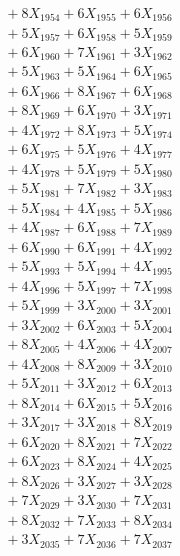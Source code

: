 \documentclass[a4paper,10pt]{article}
\begin{document}
{\begin{align}
&\;  + 8 X_{1954} + 6 X_{1955} + 6 X_{1956} \\[0.3ex]
&\;  + 5 X_{1957} + 6 X_{1958} + 5 X_{1959} \\[0.5ex]\allowbreak
&\;  + 6 X_{1960} + 7 X_{1961} + 3 X_{1962} \\[0.3ex]
&\;  + 5 X_{1963} + 5 X_{1964} + 6 X_{1965} \\[0.3ex]
&\;  + 6 X_{1966} + 8 X_{1967} + 6 X_{1968} \\[0.3ex]
&\;  + 8 X_{1969} + 6 X_{1970} + 3 X_{1971} \\[0.3ex]
&\;  + 4 X_{1972} + 8 X_{1973} + 5 X_{1974} \\[0.3ex]
&\;  + 6 X_{1975} + 5 X_{1976} + 4 X_{1977} \\[0.3ex]
&\;  + 4 X_{1978} + 5 X_{1979} + 5 X_{1980} \\[0.3ex]
&\;  + 5 X_{1981} + 7 X_{1982} + 3 X_{1983} \\[0.3ex]
&\;  + 5 X_{1984} + 4 X_{1985} + 5 X_{1986} \\[0.3ex]
&\;  + 4 X_{1987} + 6 X_{1988} + 7 X_{1989} \\[0.5ex]\allowbreak
&\;  + 6 X_{1990} + 6 X_{1991} + 4 X_{1992} \\[0.3ex]
&\;  + 5 X_{1993} + 5 X_{1994} + 4 X_{1995} \\[0.3ex]
&\;  + 4 X_{1996} + 5 X_{1997} + 7 X_{1998} \\[0.3ex]
&\;  + 5 X_{1999} + 3 X_{2000} + 3 X_{2001} \\[0.3ex]
&\;  + 3 X_{2002} + 6 X_{2003} + 5 X_{2004} \\[0.3ex]
&\;  + 8 X_{2005} + 4 X_{2006} + 4 X_{2007} \\[0.3ex]
&\;  + 4 X_{2008} + 8 X_{2009} + 3 X_{2010} \\[0.3ex]
&\;  + 5 X_{2011} + 3 X_{2012} + 6 X_{2013} \\[0.3ex]
&\;  + 8 X_{2014} + 6 X_{2015} + 5 X_{2016} \\[0.3ex]
&\;  + 3 X_{2017} + 3 X_{2018} + 8 X_{2019} \\[0.5ex]\allowbreak
&\;  + 6 X_{2020} + 8 X_{2021} + 7 X_{2022} \\[0.3ex]
&\;  + 6 X_{2023} + 8 X_{2024} + 4 X_{2025} \\[0.3ex]
&\;  + 8 X_{2026} + 3 X_{2027} + 3 X_{2028} \\[0.3ex]
&\;  + 7 X_{2029} + 3 X_{2030} + 7 X_{2031} \\[0.3ex]
&\;  + 8 X_{2032} + 7 X_{2033} + 8 X_{2034} \\[0.3ex]
&\;  + 3 X_{2035} + 7 X_{2036} + 7 X_{2037} \\[0.3ex]

\end{align}}
\end{document}
